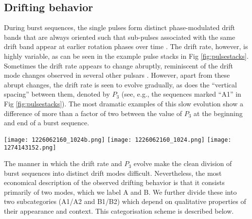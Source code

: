 \documentclass[twocolumn]{aastex631}
\begin{document}
\subsection{Drifting behavior}
\label{sec:drifting_analysis}

During burst sequences, the single pulses form distinct phase-modulated drift bands that are always oriented such that sub-pulses associated with the same drift band appear at earlier rotation phases over time \citep[`positive drifting' in the classification scheme of][]{Basu2019a}.
The drift rate, however, is highly variable, as can be seen in the example pulse stacks in Fig \ref{fig:pulsestacks}.
Sometimes the drift rate appears to change abruptly, reminiscent of the drift mode changes observed in several other pulsars \citep[e.g.][]{Kloumann2010,Rankin2013,Joshi2017,McSweeney2019a}.
However, apart from these abrupt changes, the drift rate is seen to evolve gradually, as does the ``vertical spacing'' between them, denoted by $P_3$ (see, e.g., the sequences marked ``A1'' in Fig \ref{fig:pulsestacks}).
The most dramatic examples of this slow evolution show a difference of more than a factor of two between the value of $P_3$ at the beginning and end of a burst sequence.

\begin{figure*}[!t]
    \centering
    \texttt{[image: 1226062160\_1024b.png]}
    \texttt{[image: 1226062160\_1024.png]}
    \texttt{[image: 1274143152.png]}
    \caption{Three sets of 551 consecutive pulses from observations on MJD 58434 (left, middle) and 58991 (right), with labels identifying the classification of drift modes. To increase the visual contrast, the pulses have been smoothed with a $\sigma = 1^\circ$ Gaussian and the colour ranges manually adjusted (the flux densities have arbitrary units, and are not shown here). The origin of the phase axis has been set for each observation independently to correspond approximately to the peak of the average profile. See the main text for a description of the modes.}
    \label{fig:pulsestacks}
\end{figure*}

The manner in which the drift rate and $P_3$ evolve make the clean division of burst sequences into distinct drift modes difficult.
Nevertheless, the most economical description of the observed drifting behavior is that it consists primarily of two modes, which we label A and B.
We further divide these into two subcategories (A1/A2 and B1/B2) which depend on qualitative properties of their appearance and context.
This categorisation scheme is described below.
\end{document}
